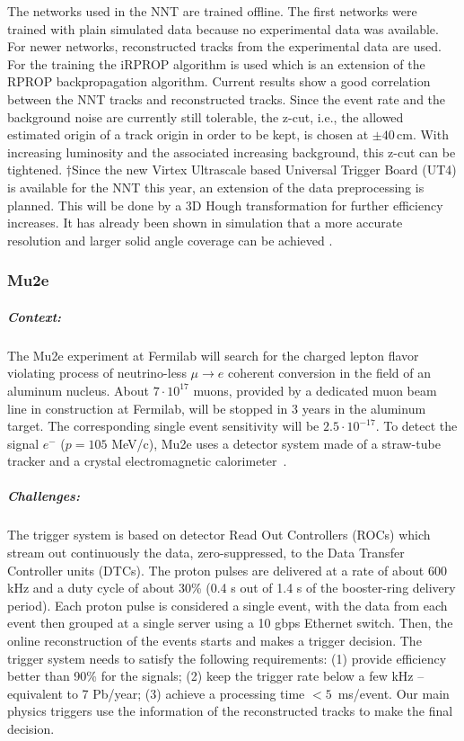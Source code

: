 The networks used in the NNT are trained offline. 
The first networks were trained with plain simulated data because no experimental data was available. 
For newer networks, reconstructed tracks from the experimental data are used. 
For the training the iRPROP algorithm is used which is an extension of the RPROP backpropagation algorithm. Current results show a good correlation between the NNT tracks and reconstructed tracks. 
Since the event rate and the background noise are currently still tolerable, the z-cut, i.e., the allowed estimated origin of a track origin in order to be kept, is chosen at $\pm 40$\,cm. 
With increasing luminosity and the associated increasing background, this z-cut can be tightened. 
†Since the new Virtex Ultrascale based Universal Trigger Board (UT4) is available for the NNT this year, an extension of the data preprocessing is planned. 
This will be done by a 3D Hough transformation for further efficiency increases. 
It has already been shown in simulation that a more accurate resolution and larger solid angle coverage can be achieved \cite{Skambraks_2020}.

\subsubsection{Mu2e}
\subparagraph*{Context:} The Mu2e experiment at Fermilab will search for the charged lepton flavor violating process of neutrino-less $\mu \to e$ coherent conversion in the field of an aluminum nucleus. 
About $7\cdot 10^{17}$ muons, provided by a dedicated muon beam line in construction at Fermilab, will be stopped in 3 years in the aluminum target. The corresponding single event sensitivity will be $2.5\cdot 10^{-17}$. 
To detect the signal $e^-$ ($p=105$ MeV/c), Mu2e uses a detector system made of a straw-tube tracker and a crystal electromagnetic calorimeter~\cite{MU2E}. 

\subparagraph*{Challenges:} The trigger system is based on detector Read Out Controllers (ROCs) which stream out continuously the data, zero-suppressed, to the Data Transfer Controller units (DTCs). The proton pulses are delivered at a rate of about 600 kHz and a duty cycle of about 30\% (0.4 s out of 1.4 s of the booster-ring delivery period). Each proton pulse is considered a single event, with the data from each event then grouped at a single server using a 10 gbps Ethernet switch. Then, the online reconstruction of the events starts and makes a trigger decision.  The trigger system needs to satisfy the following requirements: (1)  provide efficiency better than 90\% for the signals; (2)  keep the trigger rate below a few kHz -- equivalent to 7 Pb/year; (3) achieve a processing time $<5$~ms/event. Our main physics triggers use the information of the reconstructed tracks to make the final decision.  

